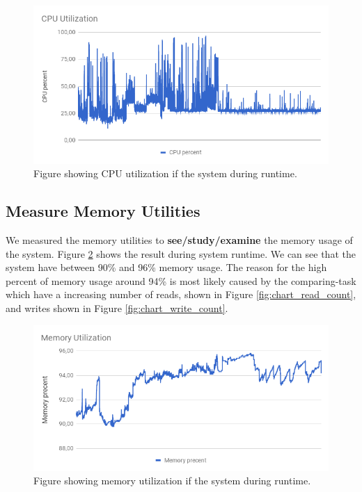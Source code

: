 \documentclass[USenglish]{uit-thesis}
\begin{document}
\begin{figure}
\centering
\includegraphics[width=\textwidth]{chart_cpu.png}
\caption{Figure showing CPU utilization if the system during runtime.}
\label{fig:chart_cpu}
\end{figure}


\subsection{Measure Memory Utilities}

We measured the memory utilities to \textbf{see/study/examine} the memory usage of the system. Figure \ref{fig:chart_memory} shows the result during system runtime. We can see that the system have between 90\% and 96\% memory usage.
The reason for the high percent of memory usage around 94\% is most likely caused by the comparing-task which have a increasing number of reads, shown in Figure \ref{fig:chart_read_count}, and writes shown in Figure \ref{fig:chart_write_count}.




\begin{figure}
\centering
\includegraphics[width=\textwidth]{chart_memory.png}
\caption{Figure showing memory utilization if the system during runtime.}
\label{fig:chart_memory}
\end{figure}
\end{document}
